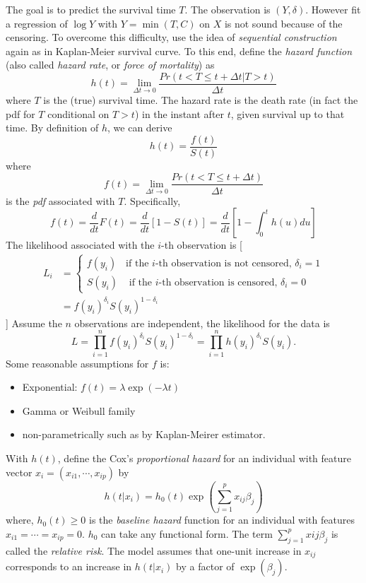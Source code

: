 \documentclass[
  letterpaper,
  DIV=11,
  numbers=noendperiod]{scrreprt}
\providecommand{\tightlist}{%
  \setlength{\itemsep}{0pt}\setlength{\parskip}{0pt}}\usepackage{longtable,booktabs,array}
\begin{document}
The goal is to predict the survival time \(T\). The observation is
\((Y, \delta)\). However fit a regression of \(\log Y\) with
\(Y=\min(T,C)\) on \(X\) is not sound because of the censoring. To
overcome this difficulty, use the idea of \emph{sequential construction}
again as in Kaplan-Meier survival curve. To this end, define the
\emph{hazard function} (also called \emph{hazard rate}, or \emph{force
of mortality}) as \[
h(t) =\lim_{\Delta t\to 0} \frac{Pr(t<T\le t+\Delta t |T>t)}{\Delta t}
\] where \(T\) is the (true) survival time. The hazard rate is the death
rate (in fact the pdf for \(T\) conditional on \(T>t\)) in the instant
after \(t\), given survival up to that time. By definition of \(h\), we
can derive \[
h(t) =\frac{f(t)}{S(t)}
\] where
\[f(t)= \lim_{\Delta t \to 0} \frac{Pr(t<T \le t+\Delta t)}{\Delta t}\]
is the \emph{pdf} associated with \(T\). Specifically, \[
f(t)=\frac{d}{dt}F(t)=\frac{d}{dt}[1-S(t)]=\frac{d}{dt} [1-\int_{0}^t h(u)du]
\] The likelihood associated with the \(i\)-th observation is {[}
\begin{align}
L_i &= \begin{cases}
f(y_i) & \text{if the }i\text{-th observation is not censored, } \delta_i =1 \\
S(y_i) & \text{ if the }i\text{-th observation is censored, } \delta_i = 0
\end{cases}\\
&=f(y_i)^{\delta_i}S(y_i)^{1-\delta_i}
\end{align} {]} Assume the \(n\) observations are independent, the
likelihood for the data is \[
L = \prod_{i=1}^n f(y_i)^{\delta_i}S(y_i)^{1-\delta_i}=\prod_{i=1}^n h(y_i)^{\delta_i}S(y_i).
\] Some reasonable assumptions for \(f\) is:

\begin{itemize}
\tightlist
\item
  Exponential: \(f(t) = \lambda \exp (-\lambda t)\)
\item
  Gamma or Weibull family
\item
  non-parametrically such as by Kaplan-Meirer estimator.
\end{itemize}

With \(h(t)\), define the Cox's \emph{proportional hazard} for an
individual with feature vector \(x_i=(x_{i1}, \cdots,x_{ip})\) by \[
h(t|x_i)= h_0(t)\exp \left(\sum_{j=1}^p x_{ij}\beta_j  \right)
\] where, \(h_0(t)\ge 0\) is the \emph{baseline hazard} function for an
individual with features \(x_{i1}=\cdots =x_{ip}=0\). \(h_0\) can take
any functional form. The term \(\sum_{j=1}^px{ij}\beta_j\) is called the
\emph{relative risk}. The model assumes that one-unit increase in
\(x_{ij}\) corresponds to an increase in \(h(t|x_i)\) by a factor of
\(\exp(\beta_j)\).
\end{document}
